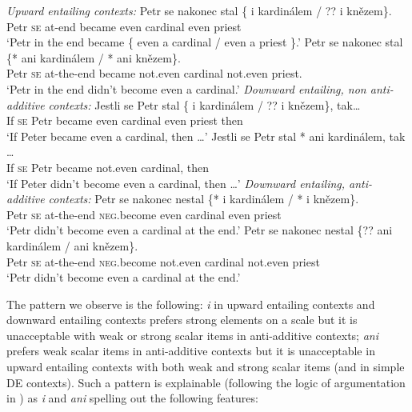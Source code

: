 \documentclass[output=paper, colorlinks, citecolor=brown, newtxmath]{langsci/langscibook}
\begin{document}
\ea\label{ex-44} \ea \textit{Upward entailing contexts:}
\ea \gll Petr se nakonec stal \{\hspace{-2pt} i kardinálem / ??\hspace{-2pt} i knězem\}.\\
Petr \textsc{se} at-end became {} even cardinal {} {} even priest\\
\glt `Petr in the end became \{ even a cardinal / even a priest \}.'
\newpage
\ex \gll Petr se nakonec stal \{*\hspace{-2pt} ani kardinálem / *\hspace{-2pt} ani knězem\}.\\
Petr \textsc{se} at-the-end became  {} not.even  cardinal {} {} not.even priest.\\
\glt `Petr in the end didn't become even a cardinal.'
\z
\ex \textit{Downward entailing, non anti-additive contexts:}
\ea \gll Jestli se Petr stal \{\hspace{-2pt} i kardinálem / ??\hspace{-2pt} i knězem\}, tak\ldots\\
If \textsc{se} Petr became {} even cardinal {} {} even priest then\\
\glt `If Peter became even a cardinal, then \ldots'
\ex\gll  Jestli se Petr stal *\hspace{-2pt} ani kardinálem, tak \ldots\\
If \textsc{se} Petr became {} not.even cardinal, then\\
\glt `If Peter didn't become even a cardinal, then \ldots'
\z
\ex  \textit{Downward entailing, anti-additive contexts:}
\ea  \gll Petr se nakonec nestal \{*\hspace{-2pt} i kardinálem / *\hspace{-2pt} i knězem\}.\\
Petr \textsc{se} at-the-end \textsc{neg}.become  {} even cardinal {} {} even priest\\
\glt `Petr didn't become even a cardinal at the end.'
\ex  \gll Petr se nakonec nestal \{??\hspace{-2pt} ani kardinálem /\hspace{1.2cm} \hspace{-2pt} ani knězem\}.\\
Petr \textsc{se} at-the-end \textsc{neg}.become {} not.even cardinal {} {} not.even priest\\
\glt `Petr didn't become even a cardinal at the end.'
\z
\z
\z

\noindent The pattern we observe is the following: \textit{i} in upward entailing contexts and downward entailing contexts prefers strong elements on a scale but it is unacceptable with weak or strong scalar items in anti-additive contexts; \textit{ani} prefers weak scalar items in anti-additive contexts but it is unacceptable in upward entailing contexts with both weak and strong scalar items (and in simple DE contexts). Such a pattern is explainable (following the logic of argumentation in \citealt{crnic2011getting}) as \textit{i} and \textit{ani} spelling out the following features:
\end{document}
